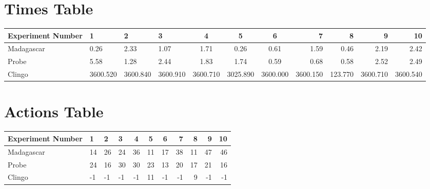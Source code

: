 \documentclass[8pt]{article}
\begin{document}
\begin{landscape}
\section{Times Table}\begin{tabular}{ | l | l | l | l | c | c | c | r | r | r | r | }\hline
Experiment Number & 1 & 2 & 3 & 4 & 5 & 6 & 7 & 8 & 9 & 10\\  \hline
Madagascar & 0.26 & 2.33 & 1.07 & 1.71 & 0.26 & 0.61 & 1.59 & 0.46 & 2.19 & 2.42\\  \hline
Probe & 5.58 & 1.28 & 2.44 & 1.83 & 1.74 & 0.59 & 0.68 & 0.58 & 2.52 & 2.49\\  \hline
Clingo & 3600.520 & 3600.840 & 3600.910 & 3600.710 & 3025.890 & 3600.000 & 3600.150 & 123.770 & 3600.710 & 3600.540\\  \hline
\end{tabular}
\section{Actions Table}\begin{tabular}{ | l | l | l | l | c | c | c | r | r | r | r | }\hline
Experiment Number & 1 & 2 & 3 & 4 & 5 & 6 & 7 & 8 & 9 & 10\\ \hline
 Madagascar & 14 & 26 & 24 & 36 & 11 & 17 & 38 & 11 & 47 & 46\\ \hline
 Probe & 24 & 16 & 30 & 30 & 23 & 13 & 20 & 17 & 21 & 16\\ \hline
 Clingo & -1 & -1 & -1 & -1 & 11 & -1 & -1 & 9 & -1 & -1\\ \hline
\end{tabular}
\end{landscape}
\end{document}
